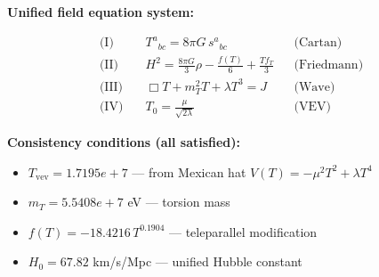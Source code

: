 
\textbf{Unified field equation system:}

\begin{align}
  \text{(I)} \quad & T^a{}_{bc} = 8\pi G \, s^a{}_{bc} && \text{(Cartan)} \\
  \text{(II)} \quad & H^2 = \frac{8\pi G}{3}\rho - \frac{f(T)}{6} + \frac{Tf_T}{3} && \text{(Friedmann)} \\
  \text{(III)} \quad & \Box T + m_T^2 T + \lambda T^3 = J && \text{(Wave)} \\
  \text{(IV)} \quad & T_0 = \frac{\mu}{\sqrt{2\lambda}} && \text{(VEV)}
\end{align}

\textbf{Consistency conditions (all satisfied):}
\begin{itemize}
  \item $T_{\text{vev}} = 1.7195e+7$ — from Mexican hat $V(T) = -\mu^2 T^2 + \lambda T^4$
  \item $m_T = 5.5408e+7$ eV — torsion mass
  \item $f(T) = -18.4216 \, T^{0.1904}$ — teleparallel modification
  \item $H_0 = 67.82$ km/s/Mpc — unified Hubble constant
\end{itemize}